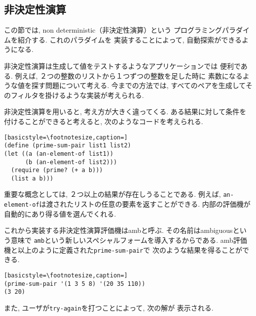 \subsection{非決定性演算}
%
この節では, non deterministic（非決定性演算）という
プログラミングパラダイムを紹介する. これのパラダイムを
実装することによって, 自動探索ができるようになる.

非決定性演算は生成して値をテストするようなアプリケーションでは
便利である. 例えば, ２つの整数のリストから１つずつの整数を足した時に
素数になるような値を探す問題について考える. 今までの方法では,
すべてのペアを生成してそのフィルタを掛けるような実装が考えられる.

非決定性演算を用いると, 考え方が大きく違ってくる. ある結果に対して条件を
付けることができると考えると, 次のようなコードを考えられる.

\begin{lstlisting}[basicstyle=\footnotesize,caption=]
(define (prime-sum-pair list1 list2)
(let ((a (an-element-of list1))
      (b (an-element-of list2)))
  (require (prime? (+ a b)))
  (list a b)))
\end{lstlisting}

重要な概念としては, ２つ以上の結果が存在しうることである. 例えば,
\lstinline{an-element-of}は渡されたリストの任意の要素を返すことができる.
内部の評価機が自動的にあり得る値を選んでくれる.

これから実装する非決定性演算評価機はambと呼ぶ. その名前はambiguousという意味で
\lstinline{amb}という新しいスペシャルフォームを導入するからである.
amb評価機と以上のように定義された\lstinline{prime-sum-pair}で
次のような結果を得ることができる.

\begin{lstlisting}[basicstyle=\footnotesize,caption=]
(prime-sum-pair '(1 3 5 8) '(20 35 110))
(3 20)
\end{lstlisting}

また, ユーザが\lstinline{try-again}を打つことによって, 次の解が
表示される.
%

%
